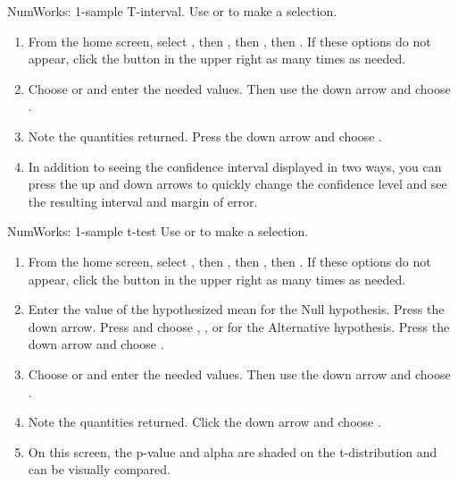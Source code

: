 \begin{onebox}{NumWorks: 1-sample T-interval.}
Use  or  to make a selection.
\begin{enumerate}
\setlength{\itemsep}{0mm}
\item From the home screen, select , then , then , then .  If these options do not appear, click the \calcbutton{$\lhookleftarrow$} button in the upper right as many times as needed. 
\item Choose  or  and enter the needed values.  Then use the down arrow and choose .
\item Note the quantities returned.  Press the down arrow and choose .
\item In addition to seeing the confidence interval displayed in two ways, you can press the up and down arrows to quickly change the confidence level and see the resulting interval and margin of error.
\begin{center}
\hspace{10mm}
\end{center}
\vspace{-1.5mm}
\end{enumerate}
\end{onebox}
%
\begin{onebox}{NumWorks: 1-sample t-test}
\label{normalnumworks}
Use  or  to make a selection.
\begin{enumerate}
\setlength{\itemsep}{0mm}
\item From the home screen, select , then , then , then .  If these options do not appear, click the \calcbutton{$\lhookleftarrow$} button in the upper right as many times as needed. 
\item Enter the value of the hypothesized mean for the Null hypothesis.  Press the down arrow.  Press  and choose \calctext{$<$}, \calctext{$\ne$} , or \calctext{$>$}  for the Alternative hypothesis.  Press the down arrow and choose . 
\item Choose  or  and enter the needed values.  Then use the down arrow and choose .
\item Note the quantities returned.  Click the down arrow and choose .
\item On this screen, the p-value and alpha are shaded on the t-distribution and can be visually compared.
\begin{center}
\hspace{10mm}
\end{center}
\vspace{-1.5mm}
\end{enumerate}
\end{onebox}
